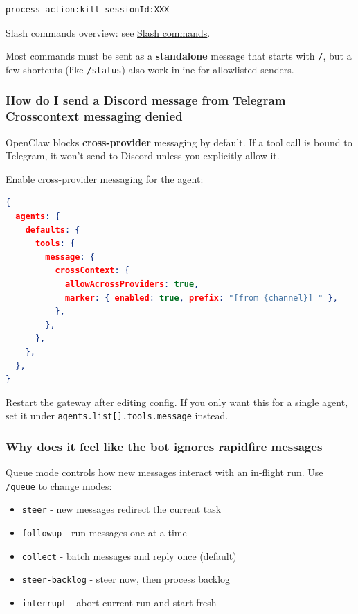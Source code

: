 \begin{lstlisting}
process action:kill sessionId:XXX
\end{lstlisting}


Slash commands overview: see \href{/tools/slash-commands}{Slash commands}.

Most commands must be sent as a \textbf{standalone} message that starts with \texttt{/}, but a few shortcuts (like \texttt{/status}) also work inline for allowlisted senders.

\subsubsection{How do I send a Discord message from Telegram Crosscontext messaging denied}


OpenClaw blocks \textbf{cross-provider} messaging by default. If a tool call is bound
to Telegram, it won't send to Discord unless you explicitly allow it.

Enable cross-provider messaging for the agent:

\begin{lstlisting}[language=json]
{
  agents: {
    defaults: {
      tools: {
        message: {
          crossContext: {
            allowAcrossProviders: true,
            marker: { enabled: true, prefix: "[from {channel}] " },
          },
        },
      },
    },
  },
}
\end{lstlisting}


Restart the gateway after editing config. If you only want this for a single
agent, set it under \texttt{agents.list[].tools.message} instead.

\subsubsection{Why does it feel like the bot ignores rapidfire messages}


Queue mode controls how new messages interact with an in-flight run. Use \texttt{/queue} to change modes:

\begin{itemize}
  \item \texttt{steer} - new messages redirect the current task
  \item \texttt{followup} - run messages one at a time
  \item \texttt{collect} - batch messages and reply once (default)
  \item \texttt{steer-backlog} - steer now, then process backlog
  \item \texttt{interrupt} - abort current run and start fresh
\end{itemize}


